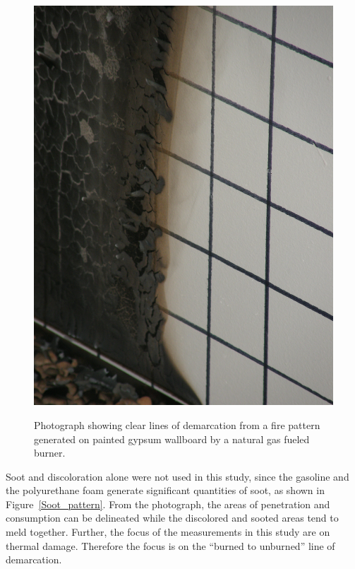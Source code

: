 \documentclass[twoside]{uocthesis}
\begin{document}
{\begin{figure}[p]
	\centering
	\includegraphics[width=\textwidth]{../Figures/demarcation}  \\
	\caption[Photograph showing clear lines of demarcation]{Photograph showing clear lines of demarcation from a fire pattern generated on painted gypsum wallboard by a natural gas fueled burner.}
	\label{demarcation}
\end{figure}

Soot and discoloration alone were not used in this study, since the gasoline and the polyurethane foam generate significant quantities of soot, as shown in Figure~\ref{Soot_pattern}.  From the photograph, the areas of penetration and consumption can be delineated while the discolored and sooted areas tend to meld together.  Further, the focus of the measurements in this study are on thermal damage.  Therefore the focus is on the ``burned to unburned'' line of demarcation.

}
\end{document}
